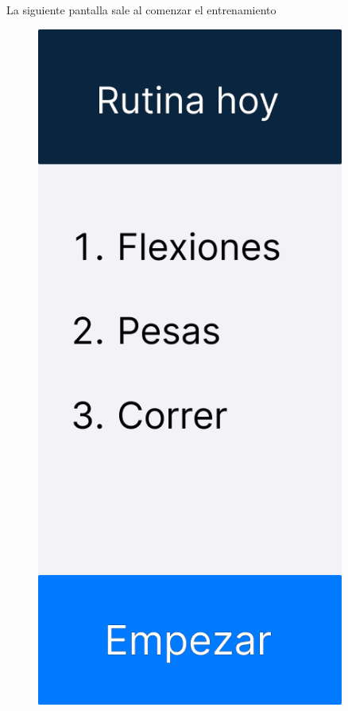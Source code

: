 La siguiente pantalla sale al comenzar el entrenamiento
\begin{figure}[H]
   \centering
   \begin{minipage}{0.45\textwidth}
      \centering
      \includegraphics[width=0.9\textwidth]{fotos/Frame 1.png}

\end{minipage}
\end{figure}
